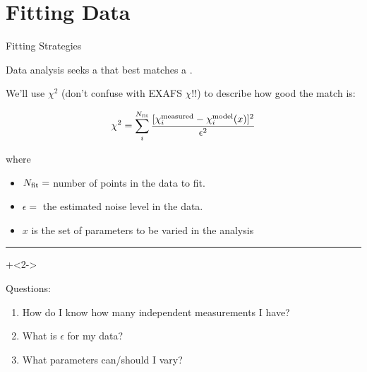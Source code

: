\section{Fitting Data}

\begin{slide}{Fitting Strategies}

  \begin{cenpage}{135mm}
  Data analysis seeks a {} that best matches a
  {}.

  \vmm

  We'll use $\chi^2$ (don't confuse with EXAFS $\chi$!!) to describe how
  good the match is:

  \[ \chi^2  =
  \sum_i^{N_{\rm fit}} \frac{[\chi_i^{\rm measured} - \chi_i^{\rm
      model}({x})]^2}{\epsilon^2}
  \]

  where
  \begin{itemize}
  \item $N_{\rm fit} = $ number of points in the data to fit.
  \item $\epsilon = $ the  estimated noise  level in the data.
  \item $x$  is the set of parameters to be varied in the analysis
  \end{itemize}

  \begin{center}
    {}
  \end{center}

  \vmm   \hrule \vmm

  \onslide+<2->

  Questions:

  \begin{enumerate}
  \item How do I know how many independent measurements I have?
  \item What is $\epsilon$ for my data?
  \item What parameters can/should I vary?
  \end{enumerate}
\end{cenpage}
\end{slide}


